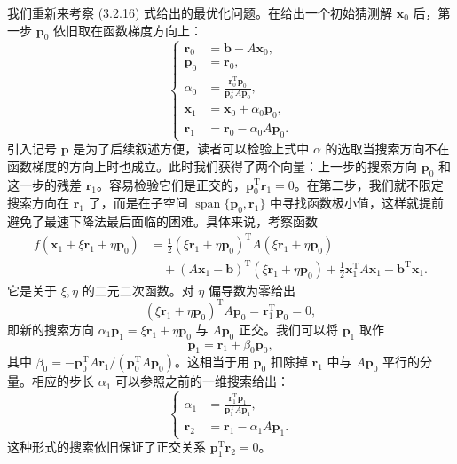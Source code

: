 我们重新来考察 (3.2.16) 式给出的最优化问题。在给出一个初始猜测解 $\bm x_0$ 后，第一步 $\bm p_0$ 依旧取在函数梯度方向上：
\begin{equation}
\left\{\begin{aligned}
\bm r_0&=\bm b-A\bm x_0,\\
\bm p_0&=\bm r_0,\\
\alpha_0&=\frac{\bm r_0^{\mathrm T}\bm p_0}{\bm p_0^{\mathrm T}A\bm p_0},\\
\bm x_1&=\bm x_0+\alpha_0\bm p_0,\\
\bm r_1&=\bm r_0-\alpha_0A\bm p_0.
\end{aligned}\right.
\tag{3.2.22}
\end{equation}
引入记号 $\bm p$ 是为了后续叙述方便，读者可以检验上式中 $\alpha$ 的选取当搜索方向不在函数梯度的方向上时也成立。此时我们获得了两个向量：上一步的搜索方向 $\bm p_0$ 和这一步的残差 $\bm r_1$。容易检验它们是正交的，$\bm p_0^{\mathrm T}\bm r_1=0$。在第二步，我们就不限定搜索方向在 $\bm r_1$ 了，而是在子空间 $\operatorname{span}\{\bm p_0,\bm r_1\}$ 中寻找函数极小值，这样就提前避免了最速下降法最后面临的困难。具体来说，考察函数
\begin{equation}
\begin{aligned}
f(\bm x_1+\xi\bm r_1+\eta\bm p_0)
&=\frac12(\xi\bm r_1+\eta\bm p_0)^{\mathrm T}A(\xi\bm r_1+\eta\bm p_0)\\
&\quad +(A\bm x_1-\bm b)^{\mathrm T}(\xi\bm r_1+\eta\bm p_0)
+\frac12\bm x_1^{\mathrm T}A\bm x_1-\bm b^{\mathrm T}\bm x_1.
\end{aligned}
\tag{3.2.23}
\end{equation}
它是关于 $\xi,\eta$ 的二元二次函数。对 $\eta$ 偏导数为零给出
\begin{equation}
(\xi\bm r_1+\eta\bm p_0)^{\mathrm T}A\bm p_0=\bm r_1^{\mathrm T}\bm p_0=0,
\tag{3.2.24}
\end{equation}
即新的搜索方向 $\alpha_1\bm p_1=\xi\bm r_1+\eta\bm p_0$ 与 $A\bm p_0$ 正交。我们可以将 $\bm p_1$ 取作
\begin{equation}
\bm p_1=\bm r_1+\beta_0\bm p_0,
\tag{3.2.25}
\end{equation}
其中 $\beta_0=-\bm p_0^{\mathrm T}A\bm r_1/(\bm p_0^{\mathrm T}A\bm p_0)$。这相当于用 $\bm p_0$ 扣除掉 $\bm r_1$ 中与 $A\bm p_0$ 平行的分量。相应的步长 $\alpha_1$ 可以参照之前的一维搜索给出：
\begin{equation}
\left\{\begin{aligned}
\alpha_1&=\frac{\bm r_1^{\mathrm T}\bm p_1}{\bm p_1^{\mathrm T}A\bm p_1},\\
\bm r_2&=\bm r_1-\alpha_1A\bm p_1.
\end{aligned}\right.
\tag{3.2.26}
\end{equation}
这种形式的搜索依旧保证了正交关系 $\bm p_1^{\mathrm T}\bm r_2=0$。

